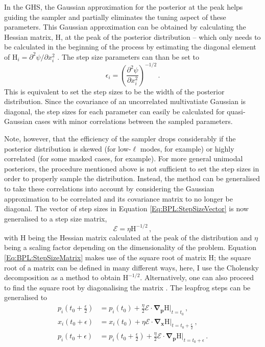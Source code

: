 \qquad In the GHS, the Gaussian approximation for the posterior at the peak helps guiding the sampler and partially eliminates the tuning aspect of these parameters. This Gaussian approximation can be obtained by calculating the Hessian matrix, $\bm{\mathrm{H}}$, at the peak of the posterior distribution -- which only needs to be calculated in the beginning of the process by estimating the diagonal element of $\mathrm{H}_i = \partial^2 \psi/\partial x_i^2$ \citep{SreeThesis,2013-GuidedHamiltonian}. The step size parameters can than be set to
\begin{equation}
    \label{Eq:BPL:StepSizeVector}
    \epsilon_i = \left( \frac{\partial^2 \psi}{\partial x_i^2}\right)^{-1/2}\, .
\end{equation}
This is equivalent to set the step sizes to be the width of the posterior distribution. Since the covariance of an uncorrelated multivatiate Gaussian is diagonal, the step sizes for each parameter can easily be calculated for quasi-Gaussian cases with minor correlations between the sampled parameters. 

\qquad Note, however, that the efficiency of the sampler drops considerably if the posterior distribution is skewed (for low-$\ell$ modes, for example) or highly correlated (for some masked cases, for example). For more general unimodal posteriors, the procedure mentioned above is not sufficient to set the step sizes in order to properly sample the distribution. Instead, the method can be generalised to take these correlations into account by considering the Gaussian approximation to be correlated and its covariance matrix to no longer be diagonal. The vector of step sizes in Equation \ref{Eq:BPL:StepSizeVector} is now generalised to a step size matrix, 
\begin{equation}
    \label{Eq:BPL:StepSizeMatrix}
    \bm{\mathcal{E}} = \eta \bm{\mathrm{H}}^{-1/2}\, ,
\end{equation}
with $\bm{\mathrm{H}}$ being the Hessian matrix calculated at the peak of the distribution and $\eta$ being a scaling factor depending on the dimensionality of the problem. Equation \ref{Eq:BPL:StepSizeMatrix} makes use of the square root of matrix $\bm{\mathrm{H}}$; the square root of a matrix can be defined in many different ways, here, I use the Cholensky decomposition \citep{Golub1996} as a method to obtain $\bm{\mathrm{H}}^{-1/2}$. Alternatively, one can also proceed to find the square root by diagonalising the matrix \citep{SreeThesis}.  The leapfrog steps can be generalised to
\begin{align}
\label{eqn::ch1_leap_forg_matrix_1}
p_i\left(t_0+\frac{\epsilon}{2}\right) & = p_i(t_0)+\frac{\eta}{2}\bm{\mathcal{E}}\cdot\mathbf{\nabla}_{\mathbf{p}}\bm{\mathrm{H}}\Big|_{t=t_0} \, ,\\
\label{eqn::ch1_leap_forg_matrix_2}
x_i(t_0+\epsilon) &= x_i(t_0)+\eta\bm{\mathcal{E}}\cdot\mathbf{\nabla}_{\mathbf{x}}\bm{\mathrm{H}}\Big|_{t=t_0+\frac{\epsilon}{2} }\, ,\\
\label{eqn::ch1_leap_forg_matrix_3}
p_i(t_0+\epsilon) & = p_i\left(t_0+\frac{\epsilon}{2}\right)+\frac{\eta}{2}\bm{\mathcal{E}}\cdot\mathbf{\nabla}_{\mathbf{p}}\bm{\mathrm{H}}\Big|_{t=t_0+\epsilon}\, .
\end{align}

